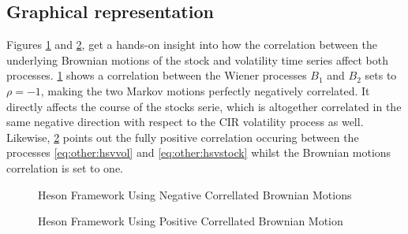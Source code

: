 \documentclass[a4paper, 12pt]{report}
\begin{document}
\subsection{Graphical representation}
\label{sub:other:heston:graphical}   

Figures \ref{p:other:uncorrelatedheston} and \ref{p:other:correlatedheston}, get a hands-on insight into how the correlation between the underlying Brownian motions of the stock and volatility time series affect both processes.
\cref{p:other:uncorrelatedheston} shows a correlation between the Wiener processes $B_1$ and $B_2$ sets to $\rho = -1$, making the two Markov motions perfectly negatively correlated. 
It directly affects the course of the stocks serie, which is altogether correlated in the same negative direction with respect to the CIR volatility process as well.
Likewise, \cref{p:other:correlatedheston} points out the fully positive correlation occuring between the processes \ref{eq:other:hsvvol} and \ref{eq:other:hsvstock} whilst the Brownian motions correlation is set to one. 

\begin{figure}[ht]
\centering
 
\caption{Heson Framework Using Negative Correllated Brownian Motions}
\label{p:other:uncorrelatedheston}
\end{figure}


\begin{figure}[ht]
\centering

\caption{Heson Framework Using Positive Correllated Brownian Motion}
\label{p:other:correlatedheston}
\end{figure}
\end{document}

